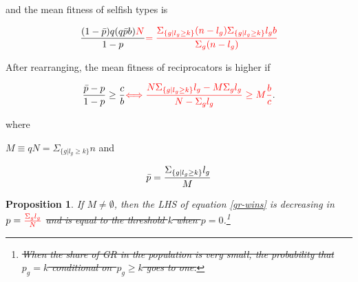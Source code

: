 \documentclass[12pt,a4paper]{article}
\newtheorem{prop}[theo]{Proposition}
\newcommand{\mm}[1]{{\color{red} #1}}
\begin{document}
and the mean fitness of selfish types is

\begin{equation*}
\frac{
  (1 - \bpi)q(q\bpi b)\mm{N}
}{
  1 - p
}
\mm{=\frac{\Sigma_{\{g|l_g \geq k\}}(n-l_g) \Sigma_{\{g|l_g \geq k\}}l_gb}{\Sigma_g(n-l_g)}}
\end{equation*}

After rearranging, the mean fitness of reciprocators is higher if


\begin{equation}
\label{gr-wins}
\frac{ \bpi - p}{ 1 - p} \ge \frac{c}{b}
\mm{\Longleftrightarrow \frac{N\Sigma_{\{g|l_g \geq k\}}l_g-M\Sigma_gl_g}{N-\Sigma_gl_g} \ge M\frac{b}{c}}.
\end{equation}

where \mm{$M \equiv qN=\Sigma_{\{g|l_g \geq k\}}n$ and 

\[
\bar{p} = \frac{\Sigma_{\{g|l_g \geq k\}}l_g}{M}
\]}

\begin{prop}
\label{prop:decrease_in_p}
    \mm{If $M \neq \emptyset$, then} the LHS of equation \eqref{gr-wins} is decreasing in $p=\mm{\frac{\Sigma_gl_g}{N}}$ \sout{and is equal
to the threshold $k$ when $p = 0$}.\footnote{\sout{
    When the share of GR in the population is very small, the probability that $p_g = k$ conditional on~$p_g\geq k$ goes to one.
}}
\end{prop}
\end{document}
